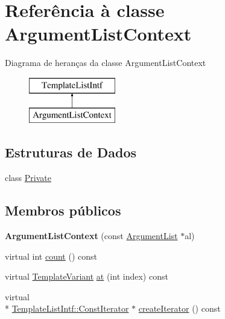 \hypertarget{class_argument_list_context}{\section{Referência à classe Argument\-List\-Context}
\label{class_argument_list_context}
}
Diagrama de heranças da classe Argument\-List\-Context\begin{figure}[H]
\begin{center}
\leavevmode
\includegraphics[height=2.000000cm]{class_argument_list_context}
\end{center}
\end{figure}
\subsection*{Estruturas de Dados}
\begin{DoxyCompactItemize}
\item 
class \hyperlink{class_argument_list_context_1_1_private}{Private}
\end{DoxyCompactItemize}
\subsection*{Membros públicos}
\begin{DoxyCompactItemize}
\item 
\hypertarget{class_argument_list_context_a575a7f15d702cbbc62f8daf44f8b1ce2}{{\bfseries Argument\-List\-Context} (const \hyperlink{class_argument_list}{Argument\-List} $\ast$al)}\label{class_argument_list_context_a575a7f15d702cbbc62f8daf44f8b1ce2}

\item 
virtual int \hyperlink{class_argument_list_context_a0745638c9967e2ed90bc96c012288c55}{count} () const 
\item 
virtual \hyperlink{class_template_variant}{Template\-Variant} \hyperlink{class_argument_list_context_a55f90d50fcb1378b2a97b9c3ad5bb162}{at} (int index) const 
\item 
virtual \\*
\hyperlink{class_template_list_intf_1_1_const_iterator}{Template\-List\-Intf\-::\-Const\-Iterator} $\ast$ \hyperlink{class_argument_list_context_a0b1d6dedc3f51750e5cba18f51022f10}{create\-Iterator} () const 
\end{DoxyCompactItemize}


